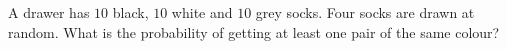 A drawer has \(10\) black, \(10\) white and \(10\) grey socks. Four socks are drawn at random. What is the probability of getting at least one pair of the same colour?
